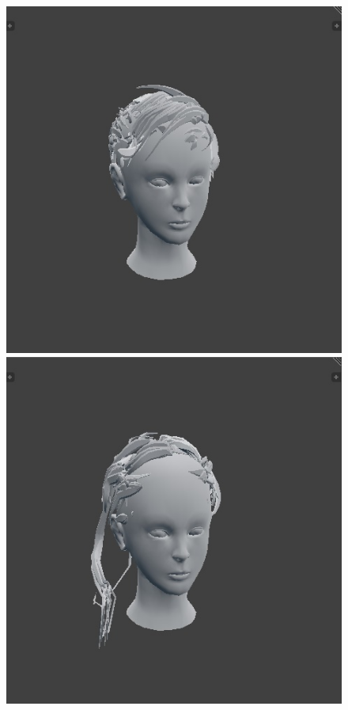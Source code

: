 \documentclass[ %
author={Dillon Keith Diep},
supervisor={Dr. Carl Henrik Ek},
degree={MEng},
title={ART-CG Hair:},
subtitle={Assisted Real-time Content Generation of Stylised Virtual Hair},
type={Research},
year={2017} ]{dissertation}
\begin{document}
\begin{figure}[!h]
		\includegraphics[scale=0.25]{images/outputMesh7}
		\includegraphics[scale=0.25]{images/outputMesh8}\\

\end{figure}
\end{document}
